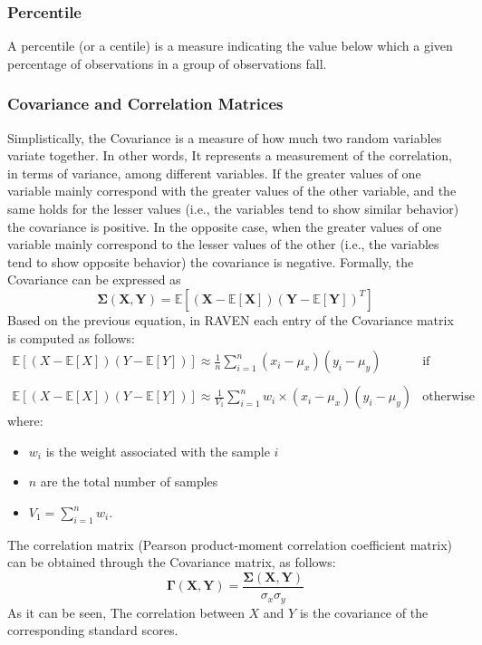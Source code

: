 \subsubsection{Percentile}
A percentile (or a centile) is a measure indicating the value below which a given percentage of observations in a group of observations fall. 

\subsubsection{Covariance and Correlation Matrices}
Simplistically, the Covariance is a measure of how much two random variables variate together. In other words, It represents a 
measurement of the correlation, in terms of variance,  among different variables. If the greater values of one variable mainly 
correspond with the greater values of the other variable, and the same holds for the lesser values (i.e., the variables tend to show 
similar behavior) the covariance is positive. In the opposite case, when the greater values of one variable mainly correspond to the 
lesser values of the other (i.e., the variables tend to show opposite behavior) the covariance is negative. 
Formally, the Covariance can be expressed as
\begin{equation}
 \boldsymbol{\Sigma}(\boldsymbol{X},\boldsymbol{Y})  = \mathbb{E} \left [ \left ( \boldsymbol{X}- \mathbb{E}\left [ \boldsymbol{X} \right ] \right ) \left ( \boldsymbol{Y}- \mathbb{E}\left [ \boldsymbol{Y} \right ] \right )^{T}\right ]
\end{equation}
Based on the previous equation, in RAVEN each entry of the Covariance matrix is computed as follows:
\begin{equation}
\begin{matrix}
 \mathbb{E} \left [ \left ( X- \mathbb{E}\left [ X \right ] \right ) \left ( Y- \mathbb{E}\left [ Y \right ] \right )\right ] \approx
 \frac{1}{n}\sum_{i=1}^{n} (x_{i} - \mu_{x})(y_{i} -  \mu_{y})  & \text{if random sampling}  
\\
\\
 \mathbb{E} \left [ \left ( X- \mathbb{E}\left [ X \right ] \right ) \left ( Y- \mathbb{E}\left [ Y \right ] \right )\right ] \approx
\frac{1}{V_{1}} \sum_{i=1}^{n} w_{i} \times (x_{i} -  \mu_{x})(y_{i} -  \mu_{y}) &   \text{otherwise}
\end{matrix}
\end{equation}
where:
\begin{itemize}
  \item $w_{i}$ is the weight associated with the sample $i$
  \item $n$ are the total number of samples
  \item $V_{1} = \sum_{i=1}^{n} w_{i}$.
\end{itemize}
The correlation matrix (Pearson product-moment correlation coefficient matrix) can be obtained through the Covariance matrix, as follows:
\begin{equation}
\boldsymbol{\Gamma}(\boldsymbol{X},\boldsymbol{Y}) = \frac{\boldsymbol{\Sigma}(\boldsymbol{X},\boldsymbol{Y})}{\sigma_{x} \sigma_{y}}
\end{equation}
As it can be seen, The correlation between $X$ and $Y$ is the 
covariance of the corresponding standard scores.

